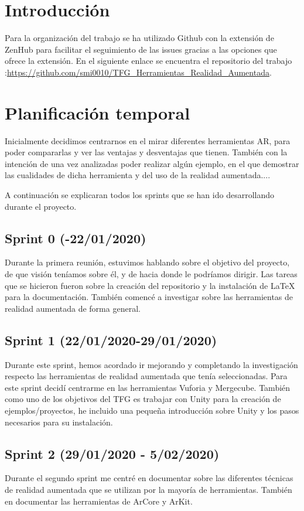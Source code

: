 
\section{Introducción}
 Para la organización del trabajo se ha utilizado Github con la extensión de ZenHub para facilitar el seguimiento de las issues gracias a las opciones que ofrece la extensión.
En el siguiente enlace se encuentra el repositorio del trabajo :\url{https://github.com/smi0010/TFG_Herramientas_Realidad_Aumentada}.
\section{Planificación temporal}
Inicialmente decidimos centrarnos en el mirar diferentes herramientas AR, para poder compararlas y ver las ventajas y desventajas que tienen.
También con la intención de una vez analizadas poder realizar algún ejemplo, en el que demostrar las cualidades de dicha herramienta y del uso de la realidad aumentada....

A continuación se explicaran todos los sprints que se han ido desarrollando durante el proyecto.

\subsection{Sprint 0 (-22/01/2020)}
Durante la primera reunión, estuvimos hablando sobre el objetivo del proyecto, de que visión teníamos sobre él, y de hacia donde le podríamos dirigir.
Las tareas que se hicieron fueron sobre la creación del repositorio y la instalación de \LaTeX{} para la documentación. También comencé a investigar sobre las herramientas de realidad aumentada de forma general.

\subsection{Sprint 1 (22/01/2020-29/01/2020)}
Durante este sprint, hemos acordado ir mejorando y completando  la investigación respecto las herramientas de realidad aumentada que tenía seleccionadas.
Para este sprint decidí centrarme en las herramientas Vuforia y Mergecube.
También como uno de los objetivos del TFG es trabajar con Unity para la creación de ejemplos/proyectos, he incluido una pequeña introducción sobre Unity y los pasos necesarios para su instalación.
\subsection{Sprint 2 (29/01/2020 - 5/02/2020)}
Durante el segundo sprint me centré en documentar sobre las diferentes técnicas de realidad aumentada que se utilizan por la mayoría de herramientas.
También en documentar las herramientas de ArCore y ArKit.

